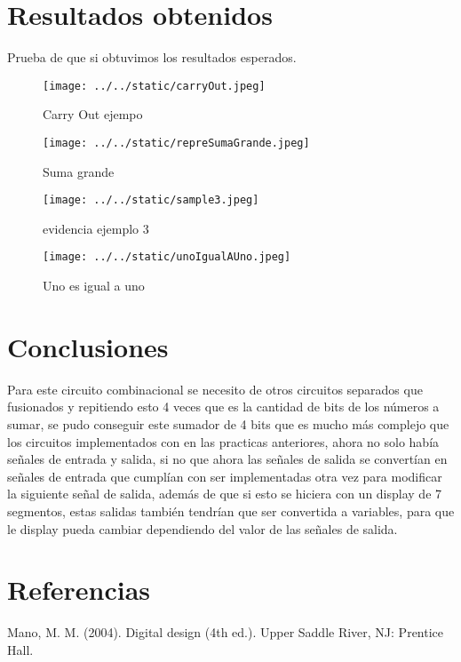 \documentclass{article}
\begin{document}
\begin{multicols}{2}
	
\section{Resultados obtenidos}\label{sec:resObtenidos}
Prueba de que si obtuvimos los resultados esperados.
\begin{figure}[H]
	\centering	
	\texttt{[image: ../../static/carryOut.jpeg]}
	\caption{Carry Out ejempo}
	\label{fig:1}
\end{figure}

\begin{figure}[H]
	\centering
	\texttt{[image: ../../static/repreSumaGrande.jpeg]}
	\caption{Suma grande}
	\label{fig:2}
\end{figure}

\begin{figure}[H]
	\centering	
	\texttt{[image: ../../static/sample3.jpeg]}	
	\caption{evidencia ejemplo 3}
	\label{fig:3}
\end{figure}

\begin{figure}[H]
	\centering	
	\texttt{[image: ../../static/unoIgualAUno.jpeg]}
	\caption{Uno es igual a uno}
	\label{fig:4}
\end{figure}

\section{Conclusiones}\label{sec:conclusion}
Para este circuito combinacional se necesito de otros circuitos separados que fusionados y repitiendo esto 4 veces que es la cantidad de bits de los números a sumar, se pudo conseguir este sumador de 4 bits que es mucho más complejo que los circuitos implementados con en las practicas anteriores, ahora no solo había señales de entrada y salida, si no que ahora las señales de salida se convertían en señales de entrada que cumplían con ser implementadas otra vez para modificar la siguiente señal de salida, además de que si esto se hiciera con un display de 7 segmentos, estas salidas también tendrían que ser convertida a variables, para que le display pueda cambiar dependiendo del valor de las señales de salida.
\section*{Referencias}\label{sec:referencias}	
\begin{thebibliography}{1}						%
Mano, M. M. (2004). Digital design (4th ed.). Upper Saddle River, NJ: Prentice Hall.
\end{thebibliography}
\end{multicols}
\end{document}
